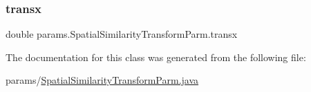 \mbox{\label{classparams_1_1_spatial_similarity_transform_parm_aca67c037fdd9703e00d1b2a01e4c34b7}} 
\subsubsection{\texorpdfstring{transx}{transx}}
{\footnotesize\ttfamily double params.\+Spatial\+Similarity\+Transform\+Parm.\+transx\hspace{0.3cm}{\ttfamily [private]}}



The documentation for this class was generated from the following file\+:\begin{DoxyCompactItemize}
\item 
params/\hyperlink{_spatial_similarity_transform_parm_8java}{Spatial\+Similarity\+Transform\+Parm.\+java}\end{DoxyCompactItemize}
